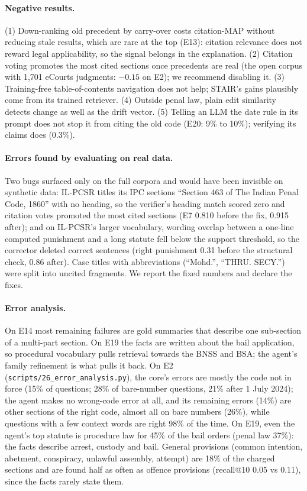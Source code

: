 \documentclass[sigconf,nonacm]{acmart}
\begin{document}
\paragraph{Negative results.} (1) Down-ranking old precedent by carry-over costs citation-MAP
without reducing stale results, which are rare at the top (E13): citation relevance does not reward
legal applicability, so the signal belongs in the explanation. (2) Citation voting promotes the most
cited sections once precedents are real (the open corpus with 1,701 eCourts judgments: $-0.15$ on
E2); we recommend disabling it. (3) Training-free table-of-contents navigation does not help;
STAIR's gains plausibly come from its trained retriever. (4) Outside penal law, plain edit
similarity detects change as well as the drift vector. (5) Telling an LLM the date rule in its prompt does not stop it
from citing the old code (E20: 9\% to 10\%); verifying its claims does (0.3\%).

\paragraph{Errors found by evaluating on real data.} Two bugs surfaced only on the full corpora and
would have been invisible on synthetic data: IL-PCSR titles its IPC sections ``Section 463 of The
Indian Penal Code, 1860'' with no heading, so the verifier's heading match scored zero and citation
votes promoted the most cited sections (E7 0.810 before the fix, 0.915 after); and on IL-PCSR's
larger vocabulary, wording overlap between a one-line computed punishment and a long statute fell
below the support threshold, so the corrector deleted correct sentences (right punishment 0.31
before the structural check, 0.86 after). Case titles with abbreviations (``Mohd.'', ``THRU. SECY.'')
were split into uncited fragments. We report the fixed numbers and declare the fixes.

\paragraph{Error analysis.} On E14 most remaining failures are gold summaries that describe
one sub-section of a multi-part section. On E19 the facts are written about the bail application,
so procedural vocabulary pulls retrieval towards the BNSS and BSA; the agent's family refinement is
what pulls it back. On E2 (\texttt{scripts/26\_error\_analysis.py}), the core's errors are mostly the code not in force
(15\% of questions; 28\% of bare-number questions, 21\% after 1 July 2024); the agent makes no
wrong-code error at all, and its remaining errors (14\%) are other sections of the right code,
almost all on bare numbers (26\%), while questions with a few context words are right 98\% of the
time. On E19, even the agent's top statute is procedure law for 45\% of the bail orders (penal law
37\%): the facts describe arrest, custody and bail. General provisions (common intention, abetment,
conspiracy, unlawful assembly, attempt) are 18\% of the charged sections and are found half as often
as offence provisions (recall@10 0.05 vs 0.11), since the facts rarely state them.
\end{document}

